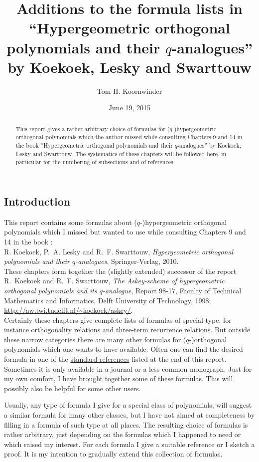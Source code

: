 \documentclass[twoside,11pt]{article}
\newcommand\sa{\smallskipamount}
\newcommand\sLP{\\[\sa]}
\newcommand\sPP{\\[\sa]\indent}
\begin{document}
\title{Additions to the formula lists in
``Hypergeometric orthogonal polynomials and their $q$-analogues''
by Koekoek, Lesky and Swarttouw}
\author{Tom H. Koornwinder}
\date{June 19, 2015}
\maketitle
\begin{abstract}
This report gives a rather arbitrary choice of formulas for
($q$-)hypergeometric orthogonal polynomials which the author missed
while consulting Chapters 9 and 14 in the book
``Hypergeometric orthogonal polynomials and their $q$-analogues''
by Koekoek, Lesky and Swarttouw. The systematics of these chapters will be followed
here, in particular for the numbering of subsections and of references.
\end{abstract}
%
\subsection*{Introduction}
\label{sec_intro}
This report contains some formulas about ($q$-)hypergeometric
orthogonal polynomials which I missed but wanted to use
while consulting Chapters 9 and 14 in the book :
\sLP
R. Koekoek, P.~A. Lesky and R.~F. Swarttouw,
{\em Hypergeometric orthogonal polynomials and their $q$-analogues},
Springer-Verlag, 2010.
\sLP
These chapters form together the (slightly extended) successor of the report
\sLP
R.~Koekoek and  R.~F. Swarttouw,
{\em The Askey-scheme of hypergeometric orthogonal
polynomials and its $q$-analogue},
Report 98-17, Faculty of Technical Mathematics and Informatics,
Delft University of Technology, 1998;
\url{http://aw.twi.tudelft.nl/~koekoek/askey/}.
\sPP
Certainly these chapters give complete lists of formulas of special type, for instance
orthogonality relations and three-term recurrence relations. But outside these narrow
categories there are many other
formulas for ($q$-)orthogonal polynomials which one wants to have available.
Often one can find the desired formula in one of the 
\hyperref[sec_ref1]{standard references} listed at the end of this report.
Sometimes it is only available in a journal or a less common monograph.
Just for my own comfort, I have brought together some of these formulas.
This will possibly also be helpful for some other users.

Usually, any type of formula I give for a special class of polynomials, will suggest
a similar formula for many other classes, but I have not aimed at completeness
by filling in a formula of such type at all places. The resulting choice of formulas is
rather arbitrary, just depending on the formulas which I happened to need or which raised my interest.
For each formula I give  a suitable reference or I sketch a
proof.
It is my intention to gradually extend this collection of formulas.
%
\end{document}
